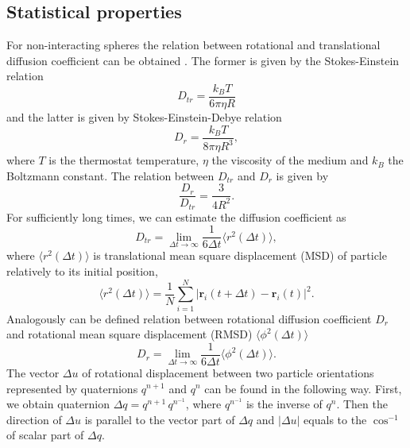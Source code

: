 \subsection{Statistical properties}
\label{subsec:statistical_properties}
For non-interacting spheres the relation between rotational and translational diffusion coefficient can be obtained \cite{C5SM02754C}. The former is given by the Stokes-Einstein relation
\begin{equation}
	D_{tr} = \frac{k_B T}{6 \pi \eta R}
\end{equation}
and the latter is given by Stokes-Einstein-Debye relation
\begin{equation}
	D_r = \frac{k_B T}{8 \pi \eta R^3}
	,
\end{equation}
where $T$ is the thermostat temperature, $\eta$ the viscosity of the medium and $k_B$ the Boltzmann constant. The relation between $D_{tr}$ and $D_r$ is given by
\begin{equation}
	\frac{D_r}{D_{tr}} = \frac{3}{4 R^2}
	.
\end{equation}
For sufficiently long times, we can estimate the diffusion coefficient as
\begin{equation}
\label{eq:translation_diffusion_vs_displacement}
	D_{tr} = \lim_{\Delta t \to \infty} \frac{1}{6 \Delta t} \langle r^2(\Delta t)\rangle
	,
\end{equation}
where $\langle r^2(\Delta t)\rangle$ is translational mean square displacement (MSD) of particle relatively to its initial position,
\begin{equation}
	\langle r^2(\Delta t)\rangle
	 = \frac{1}{N} \sum_{i=1}^{N} |\boldsymbol{r}_i(t + \Delta t) - \boldsymbol{r}_i(t)|^2
	 .
\end{equation}
Analogously can be defined relation between rotational diffusion coefficient $D_r$ and rotational mean square displacement (RMSD) $\langle \phi^2(\Delta t) \rangle$
\begin{equation}
\label{eq:rotational_diffusion_vs_displacement}
	D_r = \lim_{\Delta t \to \infty} \frac{1}{6 \Delta t} \langle \phi^2(\Delta t)\rangle
	.
\end{equation}
The vector $\Delta u$ of rotational displacement between two particle orientations represented by quaternions $q^{n+1}$ and $q^n$ can be found in the following way. First, we obtain quaternion $\Delta q = q^{n+1}\, q^{n^{-1}}$, where $q^{n^{-1}}$ is the inverse of $q^n$. Then the direction of $\Delta u$ is parallel to the vector part of $\Delta q$ and $|\Delta u|$ equals to the $\cos^{-1}$ of scalar part of $\Delta q$.

